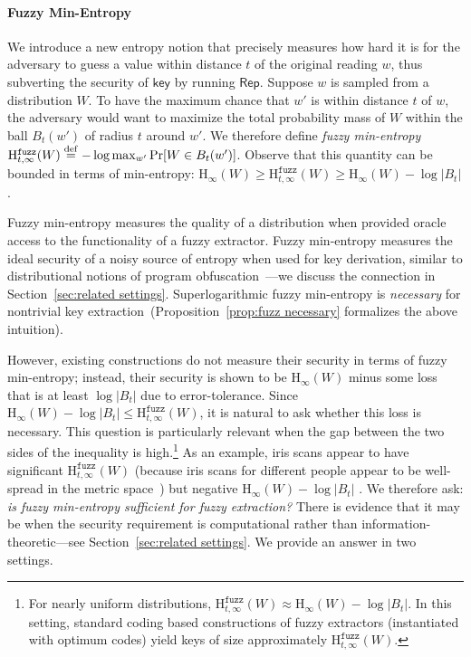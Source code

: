\documentclass[11pt]{article}
\newcommand{\secref}[1]{\mbox{Section~\ref{#1}}}
\newcommand{\propref}[1]{\mbox{Proposition~\ref{#1}}}
\newcommand{\class}[1]{{\ensuremath{\mathsf{#1}}}}
\newcommand{\key}{\ensuremath{\class{key}}\xspace}
\newcommand{\rep}{\ensuremath{\class{Rep}}\xspace}
\newcommand{\eqdef}{\stackrel{\rm def}{=}}
\newcommand{\Hoo}{\mathrm{H}_\infty}
\newcommand{\Hfuzz}{\mathrm{H}^{\mathtt{fuzz}}_{t,\infty}}
\begin{document}
\paragraph{Fuzzy Min-Entropy}
We introduce a new entropy notion that precisely measures how hard it is for the adversary to guess a value within distance $t$ of the original reading $w$, thus subverting the security of $\key$ by running $\rep$. Suppose $w$ is sampled from a distribution $W$.   To have the maximum chance that $w'$ is within distance $t$ of $w$, the adversary would want to maximize the total probability mass of $W$ within the ball $B_t(w')$ of radius $t$ around $w'$.
We  therefore define \emph{fuzzy min-entropy} $\Hfuzz(W) \eqdef -\log \max_{w'} \Pr[W\in B_t(w')]$.  Observe that this quantity can be bounded in terms of min-entropy: $\Hoo(W) \ge \Hfuzz(W) \ge \Hoo(W)-\log |B_t|$.

Fuzzy min-entropy measures the quality of a distribution when provided oracle access to the functionality of a fuzzy extractor.  Fuzzy min-entropy measures the ideal security of a noisy source of entropy when used for key derivation, similar to distributional notions of program obfuscation~\cite{barak2001possibility,DBLP:conf/stoc/DodisS05,DBLP:conf/tcc/DodisS05}---we discuss the connection in \secref{sec:related settings}.  Superlogarithmic fuzzy min-entropy is \emph{necessary} for nontrivial key extraction~(\propref{prop:fuzz necessary} formalizes the above intuition).  

However, existing constructions do not measure their security in terms of fuzzy min-entropy; instead, their security is shown to be  $\Hoo(W)$ minus some loss that is at least $\log |B_t|$ due to error-tolerance. Since $\Hoo(W)-\log |B_t| \le \Hfuzz(W)$, it is natural to ask whether this loss is necessary. This question is particularly relevant when the gap between the two sides of the inequality is high.\footnote{For nearly uniform distributions, $\Hfuzz(W) \approx \Hoo(W)- \log |B_t|$.  In this setting, standard coding based constructions of fuzzy extractors (instantiated with optimum codes) yield keys of size approximately $\Hfuzz(W)$.}  As an example, iris scans appear to have significant $\Hfuzz(W)$ (because iris scans for different people appear to be well-spread in the metric space~\cite{daugman2006probing}) but negative $\Hoo(W) -\log |B_t|$ \cite[Section 5]{blanton2009biometric}. We therefore ask: \emph{is fuzzy min-entropy sufficient for fuzzy extraction?} There is evidence that it may be when the security requirement is computational rather than information-theoretic---see \secref{sec:related settings}. We provide an answer in two settings.
\end{document}
